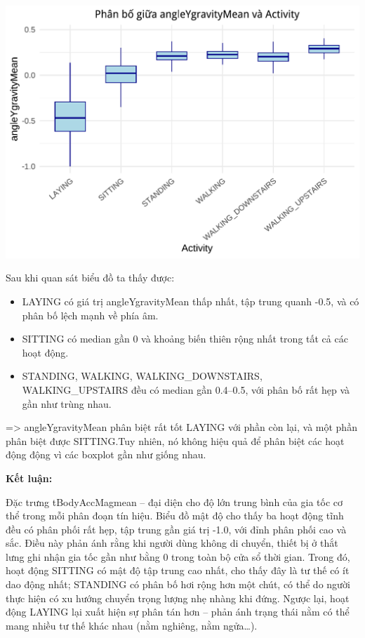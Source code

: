 \documentclass[
]{article}
\begin{document}
\includegraphics{report_files/figure-latex/unnamed-chunk-16-1.pdf}

Sau khi quan sát biểu đồ ta thấy được:

\begin{itemize}
\item
  LAYING có giá trị angleYgravityMean thấp nhất, tập trung quanh -0.5,
  và có phân bố lệch mạnh về phía âm.
\item
  SITTING có median gần 0 và khoảng biến thiên rộng nhất trong tất cả
  các hoạt động.
\item
  STANDING, WALKING, WALKING\_DOWNSTAIRS, WALKING\_UPSTAIRS đều có
  median gần 0.4--0.5, với phân bố rất hẹp và gần như trùng nhau.
\end{itemize}

=\textgreater{} angleYgravityMean phân biệt rất tốt LAYING với phần còn
lại, và một phần phân biệt được SITTING.Tuy nhiên, nó không hiệu quả để
phân biệt các hoạt động động vì các boxplot gần như giống nhau.

\textbf{Kết luận:}

Đặc trưng tBodyAccMagmean -- đại diện cho độ lớn trung bình của gia tốc
cơ thể trong mỗi phân đoạn tín hiệu. Biểu đồ mật độ cho thấy ba hoạt
động tĩnh đều có phân phối rất hẹp, tập trung gần giá trị -1.0, với đỉnh
phân phối cao và sắc. Điều này phản ánh rằng khi người dùng không di
chuyển, thiết bị ở thắt lưng ghi nhận gia tốc gần như bằng 0 trong toàn
bộ cửa sổ thời gian. Trong đó, hoạt động SITTING có mật độ tập trung cao
nhất, cho thấy đây là tư thế có ít dao động nhất; STANDING có phân bố
hơi rộng hơn một chút, có thể do người thực hiện có xu hướng chuyển
trọng lượng nhẹ nhàng khi đứng. Ngược lại, hoạt động LAYING lại xuất
hiện sự phân tán hơn -- phản ánh trạng thái nằm có thể mang nhiều tư thế
khác nhau (nằm nghiêng, nằm ngửa\ldots).
\end{document}

